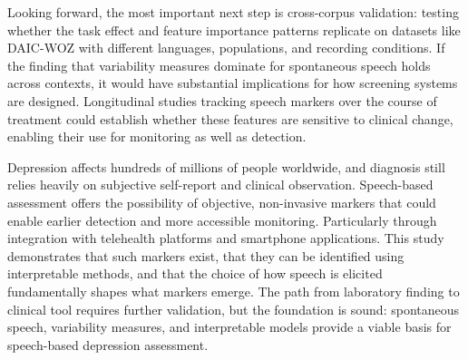 Looking forward, the most important next step is cross-corpus validation: testing whether the task effect and feature importance patterns replicate on datasets like DAIC-WOZ with different languages, populations, and recording conditions. If the finding that variability measures dominate for spontaneous speech holds across contexts, it would have substantial implications for how screening systems are designed. Longitudinal studies tracking speech markers over the course of treatment could establish whether these features are sensitive to clinical change, enabling their use for monitoring as well as detection.

Depression affects hundreds of millions of people worldwide, and diagnosis still relies heavily on subjective self-report and clinical observation. Speech-based assessment offers the possibility of objective, non-invasive markers that could enable earlier detection and more accessible monitoring. Particularly through integration with telehealth platforms and smartphone applications. This study demonstrates that such markers exist, that they can be identified using interpretable methods, and that the choice of how speech is elicited fundamentally shapes what markers emerge. The path from laboratory finding to clinical tool requires further validation, but the foundation is sound: spontaneous speech, variability measures, and interpretable models provide a viable basis for speech-based depression assessment.
